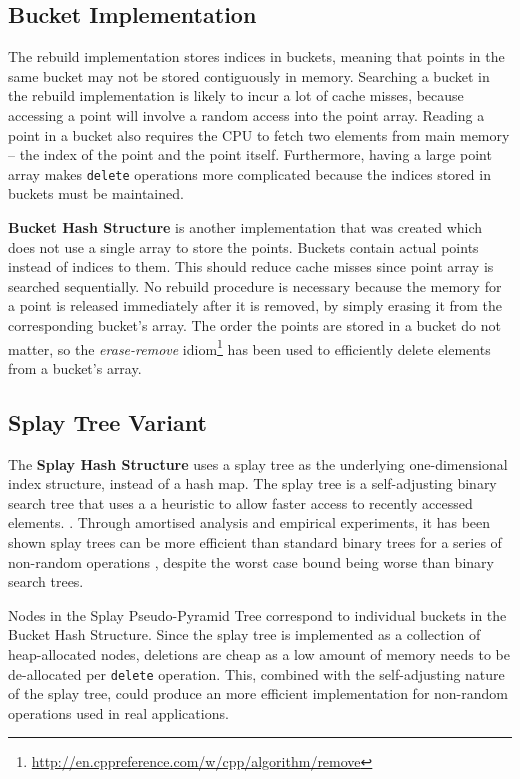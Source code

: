 \subsection{Bucket Implementation}
\label{sec:bucket-hash-structure}

The rebuild implementation stores indices in buckets, meaning that points in the same bucket may not be stored contiguously in memory. Searching a bucket in the rebuild implementation is likely to incur a lot of cache misses, because accessing a point will involve a  random access into the point array. Reading a point in a bucket also requires the CPU to fetch two elements from main memory -- the index of the point and the point itself. Furthermore, having a large point array makes \texttt{delete} operations more complicated because the indices stored in buckets must be maintained.

\textbf{Bucket Hash Structure} is another implementation that was created which does not use a single array to store the points. Buckets contain actual points instead of indices to them. This should reduce cache misses since point array is searched sequentially. No rebuild procedure is necessary because the memory for a point is released immediately after it is removed, by simply erasing it from the corresponding bucket's array. The order the points are stored in a bucket do not matter, so the \textit{erase-remove} idiom\footnote{\url{http://en.cppreference.com/w/cpp/algorithm/remove}} has been used to efficiently delete elements from a bucket's array.

\subsection{Splay Tree Variant}

The \textbf{Splay Hash Structure} uses a splay tree as the underlying one-dimensional index structure, instead of a hash map. The splay tree is a self-adjusting binary search tree that uses a a heuristic to allow faster access to recently accessed elements. \cite{splay-tree}. Through amortised analysis and empirical experiments, it has been shown splay trees can be more efficient than standard binary trees for a series of non-random operations \cite{splay-tree}, despite the worst case bound being worse than binary search trees.

Nodes in the Splay Pseudo-Pyramid Tree correspond to individual buckets in the Bucket Hash Structure. Since the splay tree is implemented as a collection of heap-allocated nodes, deletions are cheap as a low amount of memory needs to be de-allocated per \texttt{delete} operation. This, combined with the self-adjusting nature of the splay tree, could produce an more efficient  implementation for non-random operations used in real applications.

